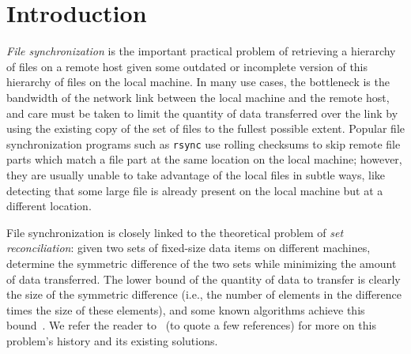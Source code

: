 \documentclass[twoside,envcountsame,runningheads]{llncs}
\newcommand{\rsync}{\texttt{rsync}\xspace}
\begin{document}

\section{Introduction}

\emph{File synchronization} is the important practical problem of
retrieving a hierarchy of files on a remote host given some outdated or
incomplete version of this hierarchy of files on the local machine. In many use
cases, the bottleneck is the bandwidth of the network link between the local machine
and the remote host, and care must be taken to limit the quantity of data
transferred over the link by using the existing copy of the set of files to the
fullest possible extent. Popular file synchronization programs such as \rsync
use rolling checksums to skip remote file parts which match a file part at the
same location on the local machine; however, they are usually unable to take
advantage of the local files in subtle ways, like detecting that some large file
is already present on the local machine but at a different location.

File synchronization is closely linked to the theoretical problem of \emph{set
reconciliation}: given two sets of fixed-size data items on different machines,
determine the symmetric difference of the two sets while minimizing the amount
of data transferred. The lower bound of the quantity of data to transfer is
clearly the size of the symmetric difference (i.e., the number of elements in the
difference times the size of these elements), and some known algorithms achieve
this bound~\cite{PSRec}. We refer the reader to~\cite{byers,Whats,PSRec,Mins1} (to
quote a few references) for more on this problem's history and its existing
solutions.
\end{document}
